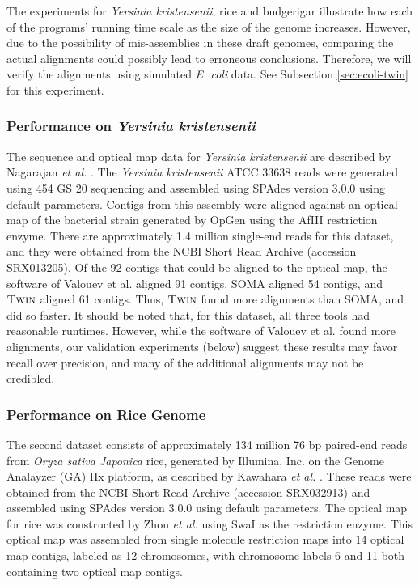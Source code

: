 The experiments for \emph{Yersinia kristensenii}, rice and budgerigar illustrate how each of the programs' running time scale as the size of the genome increases.  However, due to the possibility of mis-assemblies in these draft genomes, comparing the actual alignments could possibly lead to erroneous conclusions.  Therefore, we will verify the alignments using simulated \emph{E. coli} data.  See Subsection \ref{sec:ecoli-twin} for this experiment.



\subsubsection{Performance on \emph{Yersinia kristensenii}}
\label{sec:pro_genome}

The sequence and optical map data for  \emph{Yersinia kristensenii} are described by Nagarajan \emph{et al.} \cite{Nagarajan08}.  The \emph{Yersinia kristensenii} ATCC 33638 reads were generated using 454 GS 20 sequencing and assembled using SPAdes version 3.0.0 \cite{spades} using default parameters.   Contigs from this assembly were aligned against an optical map of the bacterial strain generated by OpGen using the AfIII restriction enzyme.  There are approximately 1.4 million single-end reads for this dataset, and they were obtained from the NCBI Short Read Archive (accession SRX013205).  Of the 92 contigs that could be aligned to the optical map, the software of  Valouev et al. aligned 91 contigs, SOMA aligned 54 contigs, and $\mbox{\rm \textsc{Twin}}$ aligned 61 contigs.  Thus, $\mbox{\rm \textsc{Twin}}$ found more alignments than SOMA, and did so faster. It should be noted that, for this dataset, all three tools had reasonable runtimes. However, while the software of Valouev et al. found more alignments, our validation experiments (below) suggest these results may favor recall over precision, and many of the additional alignments may not be credibled.


\subsubsection{Performance on Rice Genome}
\label{section:rice}

The second dataset consists of approximately 134 million 76 bp paired-end reads from \emph{Oryza sativa Japonica} rice, generated by Illumina, Inc. on the Genome Analayzer (GA) IIx platform, as described by Kawahara \emph{et al.} \cite{kawahara2013improvement}.   These reads were obtained from the NCBI Short Read Archive (accession SRX032913) and assembled using SPAdes version 3.0.0 \cite{spades} using default parameters.  The optical map for rice was constructed by Zhou \emph{et al.} \cite{rice2} using SwaI as the restriction enzyme.  This optical map was assembled from single molecule restriction maps into 14 optical map contigs, labeled as 12 chromosomes, with chromosome labels 6 and 11 both containing two optical map contigs.


